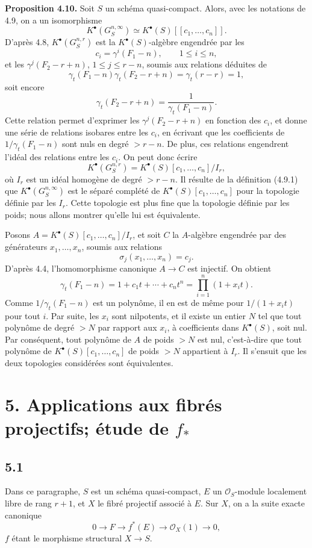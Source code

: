 \documentclass[11pt]{article}
\begin{document}
\textbf{Proposition 4.10.} Soit \(S\) un schéma quasi-compact. Alors, avec les notations de 4.9, on a un isomorphisme
\[
  K^\bullet(G_S^{n,\infty})\simeq K^\bullet(S)[[c_1,\ldots,c_n]].
\]
D'après 4.8, \(K^\bullet(G_S^{n,r})\) est la \(K^\bullet(S)\)-algèbre engendrée par les
\[
  c_i=\gamma^i(F_1-n),\qquad 1\leq i\leq n,
\]
et les \(\gamma^j(F_2-r+n)\), \(1\leq j\leq r-n\), soumis aux relations déduites de
\[
  \gamma_t(F_1-n)\gamma_t(F_2-r+n)=\gamma_t(r-r)=1,
\]
soit encore
\[
  \gamma_t(F_2-r+n)=\frac{1}{\gamma_t(F_1-n)}.
\]
Cette relation permet d'exprimer les \(\gamma^j(F_2-r+n)\) en fonction des \(c_i\), et donne une série de relations isobares entre les \(c_i\), en écrivant que les coefficients de \(1/\gamma_t(F_1-n)\) sont nuls en degré \(>r-n\). De plus, ces relations engendrent l'idéal des relations entre les \(c_i\). On peut donc écrire
\[
  K^\bullet(G_S^{n,r})=K^\bullet(S)[c_1,\ldots,c_n]/I_r,
\]
où \(I_r\) est un idéal homogène de degré \(>r-n\). Il résulte de la définition (4.9.1) que \(K^\bullet(G_S^{n,\infty})\) est le séparé complété de \(K^\bullet(S)[c_1,\ldots,c_n]\) pour la topologie définie par les \(I_r\). Cette topologie est plus fine que la topologie définie par les poids; nous allons montrer qu'elle lui est équivalente.

Posons \(A=K^\bullet(S)[c_1,\ldots,c_n]/I_r\), et soit \(C\) la \(A\)-algèbre engendrée par des générateurs \(x_1,\ldots,x_n\), soumis aux relations
\[
  \sigma_j(x_1,\ldots,x_n)=c_j.
\]
D'après 4.4, l'homomorphisme canonique \(A\to C\) est injectif. On obtient
\[
  \gamma_t(F_1-n)=1+c_1t+\cdots+c_nt^n
  =\prod_{i=1}^{n}(1+x_i t).
\]
Comme \(1/\gamma_t(F_1-n)\) est un polynôme, il en est de même pour \(1/(1+x_it)\) pour tout \(i\). Par suite, les \(x_i\) sont nilpotents, et il existe un entier \(N\) tel que tout polynôme de degré \(>N\) par rapport aux \(x_i\), à coefficients dans \(K^\bullet(S)\), soit nul. Par conséquent, tout polynôme de \(A\) de poids \(>N\) est nul, c'est-à-dire que tout polynôme de \(K^\bullet(S)[c_1,\ldots,c_n]\) de poids \(>N\) appartient à \(I_r\). Il s'ensuit que les deux topologies considérées sont équivalentes.

\section*{5. Applications aux fibrés projectifs; étude de \(f_*\)}

\subsection*{5.1}
Dans ce paragraphe, \(S\) est un schéma quasi-compact, \(E\) un \(\mathcal O_S\)-module localement libre de rang \(r+1\), et \(X\) le fibré projectif associé à \(E\). Sur \(X\), on a la suite exacte canonique
\[
  0\longrightarrow F\longrightarrow f^*(E)\longrightarrow\mathcal O_X(1)\longrightarrow 0,
\]
\(f\) étant le morphisme structural \(X\to S\).
\end{document}
